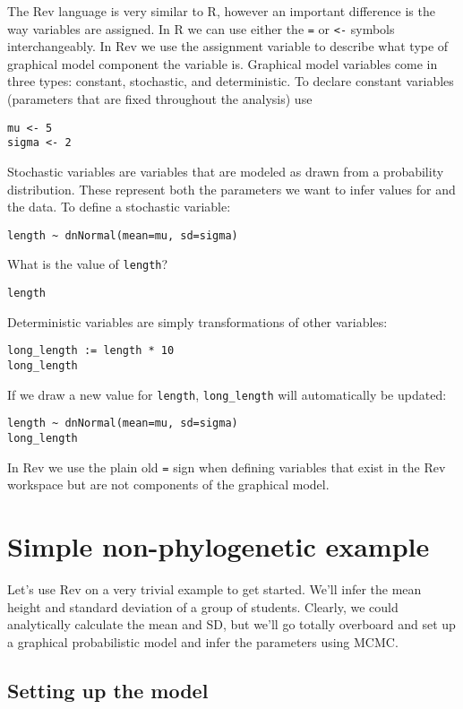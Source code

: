 \documentclass[11pt]{article}
\begin{document}
The Rev language is very similar to R, however an important 
difference is the way variables are assigned.
In R we can use either the \texttt{=} or \texttt{<-} symbols
interchangeably.
In Rev we use the assignment variable to describe
what type of graphical model component the variable is.
Graphical model variables come in three types:
constant, stochastic, and deterministic.
To declare constant variables (parameters
that are fixed throughout the analysis) use
\begin{verbatim}
mu <- 5
sigma <- 2
\end{verbatim}
Stochastic variables are variables that are modeled
as drawn from a probability distribution. 
These represent both the parameters we want to infer values for
and the data. To define a stochastic variable:
\begin{verbatim}
length ~ dnNormal(mean=mu, sd=sigma)
\end{verbatim}
What is the value of \texttt{length}?
\begin{verbatim}
length
\end{verbatim}
Deterministic variables are simply transformations of other variables:
\begin{verbatim}
long_length := length * 10
long_length
\end{verbatim}
If we draw a new value for \texttt{length}, \texttt{long\_length}
will automatically be updated:
\begin{verbatim}
length ~ dnNormal(mean=mu, sd=sigma)
long_length
\end{verbatim}
In Rev we use the plain old \texttt{=} sign 
when defining variables that exist in the Rev workspace
but are not components of the graphical model.

\section{Simple non-phylogenetic example}

Let's use Rev on a very trivial example to get started.
We'll infer the mean height and standard deviation of a group of students.
Clearly, we could analytically calculate the mean and SD, but we'll
go totally overboard and
set up a graphical probabilistic model and infer the parameters using MCMC.

\subsection{Setting up the model}
\end{document}
